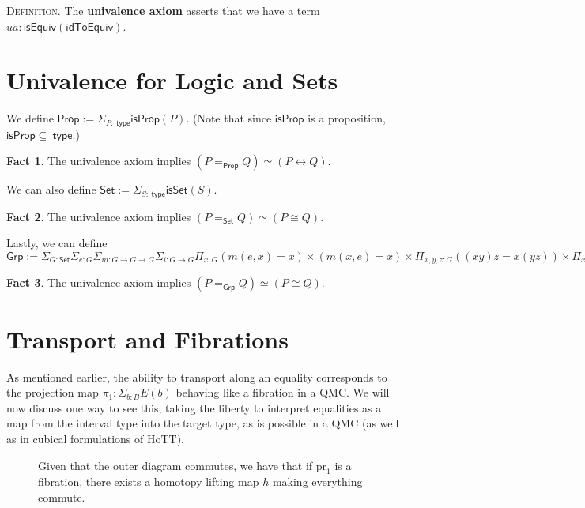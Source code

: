 \documentclass{amsart}
\theoremstyle{definition}
\newtheorem*{fact}{Fact}
\newcommand{\type}{\ensuremath{\mathsf{~type}}}
\newcommand{\Prop}{\ensuremath{\mathsf{Prop}}}
\newcommand{\isProp}{\ensuremath{\mathsf{isProp}}}
\newcommand{\Set}{\ensuremath{\mathsf{Set}}}
\newcommand{\isSet}{\ensuremath{\mathsf{isSet}}}
\newcommand{\isEquiv}{\ensuremath{\mathsf{isEquiv}}}
\newcommand{\idToEquiv}{\ensuremath{\mathsf{idToEquiv}}}
\newcommand{\Grp}{\ensuremath{\mathsf{Grp}}}
\begin{document}
\textsc{Definition.} The \textbf{univalence axiom} asserts that we have a term $ua : \isEquiv(\idToEquiv)$.

\section{Univalence for Logic and Sets}

We define $\Prop := \Sigma_{P:\type} \isProp (P)$. (Note that since $\isProp$ is a proposition, $\isProp \subseteq \type$.)

\begin{fact}
The univalence axiom implies $(P =_{\Prop} Q)\simeq (P \leftrightarrow Q)$. 
\end{fact}

We can also define $\Set := \Sigma_{S:\type} \isSet (S)$.

\begin{fact}
The univalence axiom implies $(P =_{\Set} Q)\simeq (P \cong Q)$.
\end{fact}

Lastly, we can define $ \Grp := \Sigma_{G: \Set} \Sigma_{e:G} \Sigma_{m: G\to G \to G} \Sigma_{i:G\to G} \Pi_{x:G} (m(e,x)=x) \times (m(x,e)=x) \times \Pi_{x,y,z:G}((xy)z=x(yz)) \times \Pi_{x:G}(m(ix,x)=x \times (m(x,ix)=e))$


\begin{fact}
The univalence axiom implies $(P =_{\Grp} Q)\simeq (P \cong Q)$.    
\end{fact}





\appendix

\section{Transport and Fibrations}
\label{sec:transport-explanation}

As mentioned earlier, the ability to transport along an equality corresponds to the projection map $\pi_1 : \Sigma_{b : B} E(b)$ behaving like a fibration in a QMC. We will now discuss one way to see this, taking the liberty to interpret equalities as a map from the interval type into the target type, as is possible in a QMC (as well as in cubical formulations of HoTT).

\begin{figure}[h]
    \centering
    
    \caption{Given that the outer diagram commutes, we have that if $\text{pr}_1$ is a fibration, there exists a homotopy lifting map $h$ making everything commute.}
    \label{fig:transport-as-fibration}
\end{figure}
\end{document}
